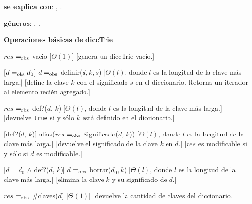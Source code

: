 \documentclass[10pt,a4paper]{article}
\begin{document}
\begin{Interfaz}

  \textbf{se explica con}: , .

  \textbf{géneros}: , .

  \textbf{Operaciones básicas de diccTrie}

  {$res$ $=_{\mathrm{obs}}$ vacio}%
  [$\Theta(1)$]
  [genera un diccTrie vacío.]

  [$d =_{\mathrm{obs}} d_0$]
  {$d$ $=_{\mathrm{obs}}$ definir($d, k, s$)}
  [$\Theta(l)$, donde $l$ es la longitud de la clave más larga.]
  [define la clave $k$ con el significado $s$ en el diccionario.  Retorna un iterador al elemento recién agregado.]

  {$res$ $=_{\mathrm{obs}}$ def?($d$, $k$)}
  [$\Theta(l)$, donde $l$ es la longitud de la clave más larga.]
  [devuelve \texttt{true} si y sólo $k$ está definido en el diccionario.]

  [def?($d$, $k$)]
  {alias($res$ $=_{\mathrm{obs}}$ Significado($d$, $k$))}
  [$\Theta(l)$, donde $l$ es la longitud de la clave más larga.]
  [devuelve el significado de la clave $k$ en $d$.]
  [$res$ es modificable si y sólo si $d$ es modificable.]

  [$d = d_0$ $\land$ def?($d$, $k$)]
  {$d$ $=_{\mathrm{obs}}$ borrar($d_0, k$)}
  [$\Theta(l)$, donde $l$ es la longitud de la clave más larga.]
  [elimina la clave $k$ y su significado de $d$.]

  {$res$ $=_{\mathrm{obs}}$ \#claves($d$)}
  [$\Theta(1)$]
  [devuelve la cantidad de claves del diccionario.]

\end{Interfaz}
\end{document}

